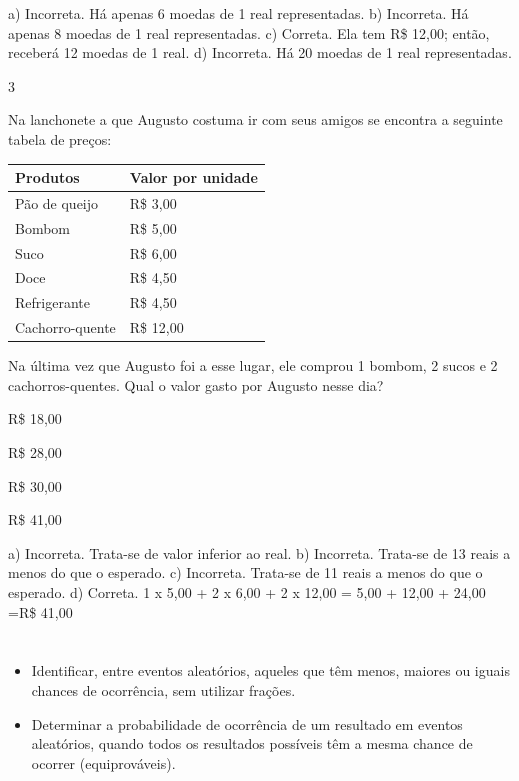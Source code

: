 \begin{escolha}
{\begin{escolha}
a) Incorreta. Há apenas 6 moedas de 1 real representadas.
b) Incorreta. Há apenas 8 moedas de 1 real representadas.
c) Correta. Ela tem R\$ 12,00; então, receberá 12 moedas de 1 real.
d) Incorreta. Há 20 moedas de 1 real representadas.

\num{3}

Na lanchonete a que Augusto costuma ir com seus amigos se encontra a
seguinte tabela de preços:

\begin{longtable}[]{@{}ll@{}}
\toprule
Produtos & Valor por unidade\tabularnewline
\midrule
\endhead
Pão de queijo & R\$ 3,00\tabularnewline
Bombom & R\$ 5,00\tabularnewline
Suco & R\$ 6,00\tabularnewline
Doce & R\$ 4,50\tabularnewline
Refrigerante & R\$ 4,50\tabularnewline
Cachorro-quente & R\$ 12,00\tabularnewline
\bottomrule
\end{longtable}

Na última vez que Augusto foi a esse lugar, ele comprou 1 bombom, 2
sucos e 2 cachorros-quentes. Qual o valor gasto por Augusto nesse dia?

\begin{escolha}

\item
  R\$ 18,00
\item
  R\$ 28,00
\item
  R\$ 30,00
\item
  R\$ 41,00
\end{escolha}

a) Incorreta. Trata-se de valor inferior ao real.
b) Incorreta. Trata-se de 13 reais a menos do que o esperado.
c) Incorreta. Trata-se de 11 reais a menos do que o esperado.
d) Correta.
1 x 5,00 + 2 x 6,00 + 2 x 12,00 = 5,00 + 12,00 + 24,00 =R\$ 41,00


\chapter{}


\begin{itemize}
    \item Identificar, entre eventos aleatórios, aqueles que têm menos, maiores ou
iguais chances de ocorrência, sem utilizar frações.

    \item Determinar a probabilidade de ocorrência de um resultado em eventos
aleatórios, quando todos os resultados possíveis têm a mesma chance de
ocorrer (equiprováveis).
\end{itemize}


\end{escolha}}
\end{escolha}
